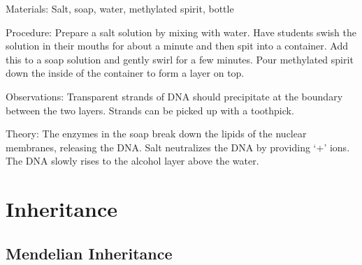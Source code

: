 \begin{multicols}{2}
\begin{description*}
\item[Materials:]{Salt, soap, water, methylated spirit, bottle}
\item[Procedure:]{Prepare a salt solution by mixing with water. Have students swish the solution in their mouths for about a minute and then spit into a container. Add this to a soap solution and gently swirl for a few minutes. Pour methylated spirit down the inside of the container to form a layer on top.}
\item[Observations:]{Transparent strands of DNA should precipitate at the boundary between the two layers. Strands can be picked up with a toothpick.}
\item[Theory:]{The enzymes in the soap break down the lipids of the nuclear membranes, releasing the DNA. Salt neutralizes the DNA by providing `+' ions. The DNA slowly rises to the alcohol layer above the water.}
\end{description*}


\section*{Inheritance}


\subsection{Mendelian Inheritance} %



\end{multicols}
